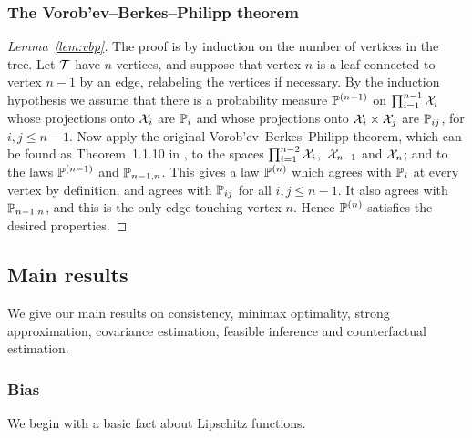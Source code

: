 \subsubsection{The Vorob'ev--Berkes--Philipp theorem}

\begin{proof}[Lemma~\ref{lem:vbp}]

  The proof is by induction on the number of vertices in the tree.
  Let $\cT$ have $n$ vertices,
  and suppose
  that vertex $n$ is a leaf
  connected to vertex $n-1$ by an edge,
  relabeling the vertices if necessary.
  By the induction hypothesis we assume that there is a
  probability measure $\P^{(n-1)}$
  on $\prod_{i=1}^{n-1} \cX_i$
  whose projections onto $\cX_i$ are $\P_i$
  and whose projections onto $\cX_i \times \cX_j$ are $\P_{i j}$,
  for $i,j \leq n-1$.
  Now apply the original
  Vorob'ev--Berkes--Philipp theorem,
  which can be found as Theorem~1.1.10 in
  \citet{dudley1999uniform},
  to the spaces
  $\prod_{i=1}^{n-2} \cX_i$,\,
  $\cX_{n-1}$ and
  $\cX_n$;
  and to the laws
  $\P^{(n-1)}$
  and
  $\P_{n-1, n}$.
  This gives a law $\P^{(n)}$
  which agrees with $\P_i$
  at every vertex by definition,
  and agrees with
  $\P_{i j}$ for all $i,j \leq n-1$.
  It also agrees with $\P_{n-1,n}$,
  and this is the only edge touching vertex $n$.
  Hence $\P^{(n)}$ satisfies the desired properties.
\end{proof}

\subsection{Main results}

We give our main results on
consistency, minimax optimality, strong approximation,
covariance estimation, feasible inference
and counterfactual estimation.

\subsubsection{Bias}

We begin with a basic fact about Lipschitz functions.

